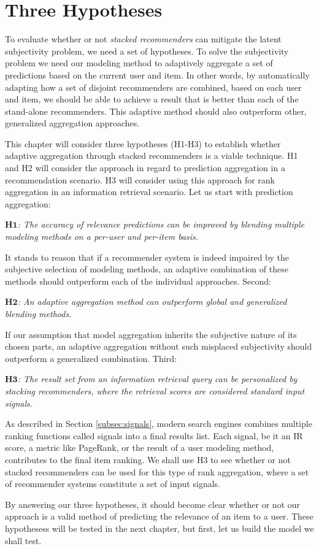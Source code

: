 \section{Three Hypotheses}
\label{sec:hypotheses}

To evaluate whether or not \emph{stacked recommenders}
can mitigate the latent subjectivity problem,
we need a set of hypotheses.
To solve the subjectivity problem we need our modeling method
to adaptively aggregate a set of predictions based on the current user and item.
In other words, by automatically adapting how a set of disjoint recommenders
are combined, based on each user and item, we should be able to achieve a
result that is better than each of the stand-alone recommenders.
This adaptive method should also outperform other, generalized aggregation approaches.

This chapter will consider three hypotheses (H1-H3) 
to establish whether adaptive aggregation through stacked recommenders is a viable technique.
H1 and H2 will consider the approach in regard to prediction aggregation
in a recommendation scenario. H3 will consider using this approach for
rank aggregation in an information retrieval scenario.
Let us start with prediction aggregation:

{
  \itshape
  $\mathbf{H1}$: The accuracy of relevance predictions can be improved
  by blending multiple modeling methods on a per-user and per-item basis.
}

It stands to reason that if a recommender system is indeed impaired
by the subjective selection of modeling methods,
an adaptive combination of these methods should outperform each of the individual approaches.
Second:

{
  \itshape
  $\mathbf{H2}$: An adaptive aggregation method can outperform global and generalized 
  blending methods.
}

If our assumption that model aggregation inherits the subjective nature of its chosen parts,
an adaptive aggregation without such misplaced subjectivity should outperform a
generalized combination.
Third:

{
  \itshape
  $\mathbf{H3}$: The result set from an information retrieval query
  can be personalized by stacking recommenders, where the retrieval scores are considered 
  standard input signals.
}

As described in Section \ref{subsec:signals},
modern search engines combines multiple ranking functions called signals into a final results list.
Each signal, be it an IR score, a metric like PageRank, or the result of a user modeling method,
contributes to the final item ranking.
We shall use H3 to see whether or not stacked recommenders can be used for this type of rank aggregation,
where a set of recommender systems constitute a set of input signals.

By answering our three hypotheses, it should become clear whether or not our approach
is a valid method of predicting the relevance of an item to a user.
These hypothesess will be tested in the next chapter, but first, let us build
the model we shall test.

